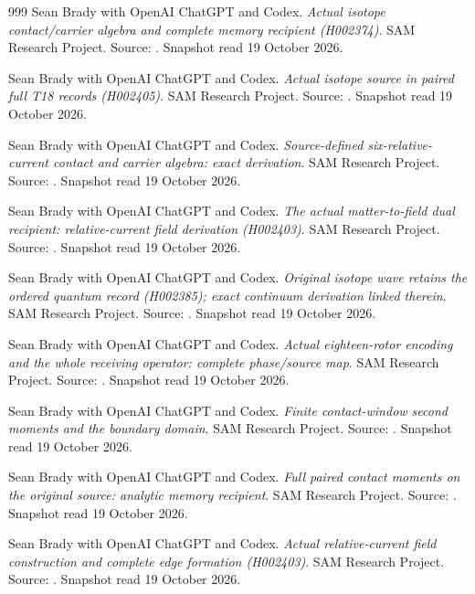 \begin{thebibliography}{999}
 Sean Brady with OpenAI ChatGPT and Codex. \emph{Actual isotope contact/carrier algebra and complete memory recipient (H002374)}. SAM Research Project. Source: . Snapshot read 19 October 2026.

 Sean Brady with OpenAI ChatGPT and Codex. \emph{Actual isotope source in paired full T18 records (H002405)}. SAM Research Project. Source: . Snapshot read 19 October 2026.

 Sean Brady with OpenAI ChatGPT and Codex. \emph{Source-defined six-relative-current contact and carrier algebra: exact derivation}. SAM Research Project. Source: . Snapshot read 19 October 2026.

 Sean Brady with OpenAI ChatGPT and Codex. \emph{The actual matter-to-field dual recipient: relative-current field derivation (H002403)}. SAM Research Project. Source: . Snapshot read 19 October 2026.

 Sean Brady with OpenAI ChatGPT and Codex. \emph{Original isotope wave retains the ordered quantum record (H002385); exact continuum derivation linked therein}. SAM Research Project. Source: . Snapshot read 19 October 2026.

 Sean Brady with OpenAI ChatGPT and Codex. \emph{Actual eighteen-rotor encoding and the whole receiving operator: complete phase/source map}. SAM Research Project. Source: . Snapshot read 19 October 2026.

 Sean Brady with OpenAI ChatGPT and Codex. \emph{Finite contact-window second moments and the boundary domain}. SAM Research Project. Source: . Snapshot read 19 October 2026.

 Sean Brady with OpenAI ChatGPT and Codex. \emph{Full paired contact moments on the original source: analytic memory recipient}. SAM Research Project. Source: . Snapshot read 19 October 2026.

 Sean Brady with OpenAI ChatGPT and Codex. \emph{Actual relative-current field construction and complete edge formation (H002403)}. SAM Research Project. Source: . Snapshot read 19 October 2026.


\end{thebibliography}
